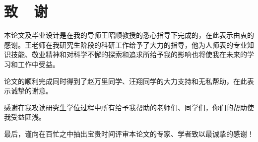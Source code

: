 \chapter*{致~~谢}
 本论文及毕业设计是在我的导师王昭顺教授的悉心指导下完成的，在此表示由衷的感谢。王老师在我研究生阶段的科研工作给予了大力的指导，他为人师表的专业知识技能、敬业精神和对科学不懈的探索和追求所给予我的影响也将使我在未来的学习和工作中受益。

论文的顺利完成同时得到了赵万里同学、汪翔同学的大力支持和无私帮助，在此表示诚挚的谢意。

感谢在我攻读研究生学位过程中所有给予我帮助的老师们、同学们，你们的帮助使我受益匪浅。

最后，谨向在百忙之中抽出宝贵时间评审本论文的专家、学者致以最诚挚的感谢！

